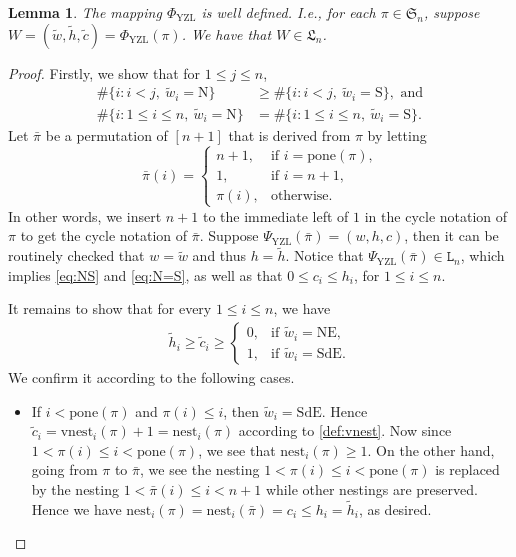\documentclass[12pt]{amsart}
\numberwithin{equation}{section}
\theoremstyle{plain}
\newtheorem{lemma}[theorem]{Lemma}
\theoremstyle{definition}
\def\YZL{\mathrm{YZL}}
\def\SS{\mathfrak{S}}
\def\LH{\mathfrak{L}}
\def\N{\mathrm{N}}
\def\S{\mathrm{S}}
\def\NE{\mathrm{NE}}
\def\SdE{\mathrm{SdE}}
\def\pone{\mathrm{pone}}
\def\vnest{\mathrm{vnest}}
\def\nest{\mathrm{nest}}
\begin{document}
\begin{lemma}
The mapping $\Phi_{\YZL}$ is well defined. I.e., for each $\pi \in \SS_n$, suppose $W=(\widetilde{w},\widetilde{h},\widetilde{c})=\Phi_{\YZL}(\pi)$.
We have that $W \in \LH_n$.
\end{lemma}
\begin{proof}
Firstly, we show that for $1\le j\le n$,
\begin{align}
\label{eq:NS}
\#\{i: i < j,\:\widetilde{w}_i=\N\} &\geq \#\{i: i < j,\:\widetilde{w}_i=\S\},\text{ and}\\[3pt]
\#\{i: 1\le i\le n,\:\widetilde{w}_i=\N\} &= \#\{i: 1\le i\le n,\:\widetilde{w}_i=\S\}.
\label{eq:N=S}
\end{align}
Let $\bar{\pi}$ be a permutation of $[n+1]$ that is derived from $\pi$ by letting
\[
\bar{\pi}(i)=\begin{cases}
	n+1, & \text{if $i=\pone(\pi)$,} \\[3pt]
	1, & \text{if $i=n+1$,} \\[3pt]
	\pi(i), & \text{otherwise}.
	\end{cases}
\]
In other words, we insert $n+1$ to the immediate left of $1$ in the cycle notation of $\pi$ to get the cycle notation of $\bar{\pi}$. Suppose $\Psi_{\YZL}(\bar{\pi})=(w,h,c)$, then it can be routinely checked that $w=\widetilde{w}$ and thus $h=\widetilde{h}$. Notice that $\Psi_{\YZL}(\bar{\pi}) \in \mathtt{L}_n$, which implies \eqref{eq:NS} and \eqref{eq:N=S}, as well as that $0\le c_i\le h_i$, for $1\le i\le n$.

It remains to show that for every $1\le i\le n$, we have
\begin{align*}
\widetilde{h}_i\ge \widetilde{c}_i\ge \begin{cases}
  0, & \text{if } \widetilde{w}_i=\NE,\\
  1, & \text{if } \widetilde{w}_i=\SdE.
\end{cases}
\end{align*}
We confirm it according to the following cases.
\begin{itemize}
  \item  If $i < \pone(\pi)$ and $\pi(i) \leq i$, then $\widetilde{w}_i=\SdE$. Hence $\widetilde{c}_i=\vnest_i(\pi)+1=\nest_i(\pi)$ according to \eqref{def:vnest}. Now since $1 < \pi(i) \le i < \pone(\pi)$, we see that $\nest_i(\pi) \ge 1$. On the other hand, going from $\pi$ to $\bar{\pi}$, we see the nesting $1 < \pi(i) \le i < \pone(\pi)$ is replaced by the nesting $1 < \bar{\pi}(i) \le i < n+1$ while other nestings are preserved. Hence we have $\nest_i(\pi)=\nest_i(\bar{\pi})=c_i\le h_i=\widetilde{h}_i$, as desired.


\end{itemize}
\end{proof}
\end{document}
